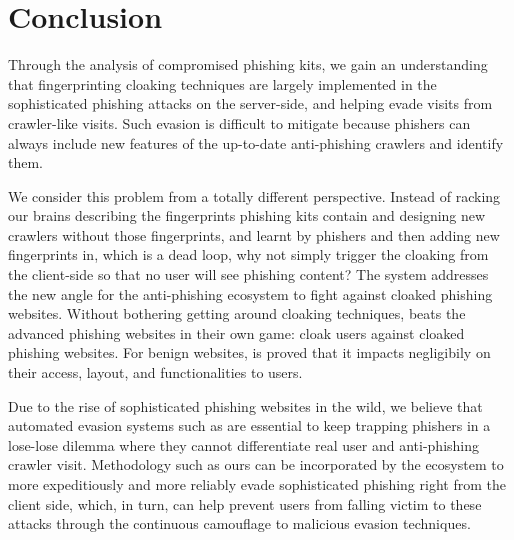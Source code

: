 \section{Conclusion}

Through the analysis of compromised phishing kits, we gain an understanding that fingerprinting cloaking techniques are largely implemented in the sophisticated phishing attacks on the server-side, and helping evade visits from crawler-like visits.
Such evasion is difficult to mitigate because phishers can always include new features of the up-to-date anti-phishing crawlers and identify them.

We consider this problem from a totally different perspective.
Instead of racking our brains describing the fingerprints phishing kits contain and designing new crawlers without those fingerprints, and learnt by phishers and then adding new fingerprints in, which is a dead loop,
why not simply trigger the cloaking from the client-side so that no user will see phishing content?
The \spartacus system addresses the new angle for the anti-phishing ecosystem to fight against cloaked phishing websites.
Without bothering getting around cloaking techniques, \spartacus beats the advanced phishing websites in their own game:
cloak users against cloaked phishing websites.
For benign websites, \spartacus is proved that it impacts negligibily on their access, layout, and functionalities to users.

Due to the rise of sophisticated phishing websites in the wild, we believe that automated evasion systems such as \spartacus are essential
to keep trapping phishers in a lose-lose dilemma where they cannot differentiate real user and anti-phishing crawler visit.
Methodology such as ours can be incorporated by the ecosystem to more expeditiously and more reliably evade sophisticated phishing right from the client side, 
which, in turn, can help prevent users from falling victim to these attacks through the
continuous camouflage to malicious evasion techniques.